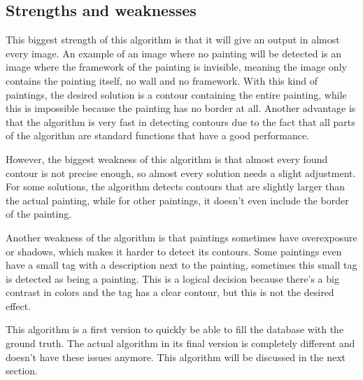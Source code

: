 \subsection{Strengths and weaknesses}

This biggest strength of this algorithm is that it will give an output in almost every image. An example of an image where no painting will be detected is an image where the framework of the painting is invisible, meaning the image only contains the painting itself, no wall and no framework. With this kind of paintings, the desired solution is a contour containing the entire painting, while this is impossible because the painting has no border at all. Another advantage is that the algorithm is very fast in detecting contours due to the fact that all parts of the algorithm are standard functions that have a good performance.

However, the biggest weakness of this algorithm is that almost every found contour is not precise enough, so almost every solution needs a slight adjustment. For some solutions, the algorithm detects contours that are slightly larger than the actual painting, while for other paintings, it doesn't even include the border of the painting.

Another weakness of the algorithm is that paintings sometimes have overexposure or shadows, which makes it harder to detect its contours. Some paintings even have a small tag with a description next to the painting, sometimes this small tag is detected as being a painting. This is a logical decision because there's a big contrast in colors and the tag has a clear contour, but this is not the desired effect.

This algorithm is a first version to quickly be able to fill the database with the ground truth. The actual algorithm in its final version is completely different and doesn't have these issues anymore. This algorithm will be discussed in the next section.
